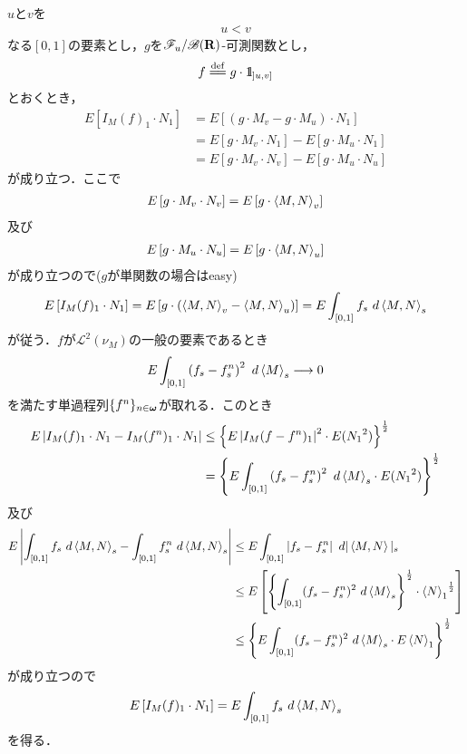	\begin{sketch}
		$u$と$v$を
		\begin{align}
			u < v
		\end{align}
		なる$[0,1]$の要素とし，$g$を$\mathscr{F}_{u}/\mathscr{B}(\mathbf{R})$-可測関数とし，
		\begin{align}
			f \defeq g \cdot \defunc_{]u,v]}
		\end{align}
		とおくとき，
		\begin{align}
			E\left[I_{M}(f)_{1} \cdot N_{1}\right] 
			&= E\left[(g \cdot M_{v} - g \cdot M_{u}) \cdot N_{1}\right] \\
			&= E\left[g \cdot M_{v} \cdot N_{1}\right] - E\left[g \cdot M_{u} \cdot N_{1}\right] \\
			&= E\left[g \cdot M_{v} \cdot N_{v}\right] - E\left[g \cdot M_{u} \cdot N_{u}\right]
		\end{align}
		が成り立つ．ここで
		\begin{align}
			E\left[g \cdot M_{v} \cdot N_{v}\right] 
			= E\left[g \cdot \inprod<M,N>_{v}\right]
		\end{align}
		及び
		\begin{align}
			E\left[g \cdot M_{u} \cdot N_{u}\right] 
			= E\left[g \cdot \inprod<M,N>_{u}\right]
		\end{align}
		が成り立つので($g$が単関数の場合はeasy)
		\begin{align}
			E\left[I_{M}(f)_{1} \cdot N_{1}\right] 
			= E\left[g \cdot \left(\inprod<M,N>_{v} - \inprod<M,N>_{u}\right)\right]
			= E \int_{[0,1]} f_{s}\ d\inprod<M,N>_{s}
		\end{align}
		が従う．$f$が$\mathscr{L}^{2}(\nu_{M})$の一般の要素であるとき
		\begin{align}
			E\int_{[0,1]} \left(f_{s} - f^{n}_{s}\right)^{2}\ d\inprod<M>_{s}
			\longrightarrow 0
		\end{align}
		を満たす単過程列$\{f^{n}\}_{n \in {\boldsymbol \omega}}$が取れる．このとき
		\begin{align}
			E\left|I_{M}(f)_{1} \cdot N_{1} - I_{M}(f^{n})_{1} \cdot N_{1}\right|
			&\leq \left\{ E\left|I_{M}(f - f^{n})_{1}\right|^{2} \cdot E({N_{1}}^{2}) \right\}^{\frac{1}{2}} \\
			&= \left\{ E\int_{[0,1]} \left(f_{s} - f^{n}_{s}\right)^{2}\ d\inprod<M>_{s} \cdot E({N_{1}}^{2}) \right\}^{\frac{1}{2}}
		\end{align}
		及び
		\begin{align}
			E\left|\int_{[0,1]}f_{s}\ d\inprod<M,N>_{s} - \int_{[0,1]} f^{n}_{s}\ d\inprod<M,N>_{s}\right|
			&\leq E\int_{[0,1]} \left| f_{s} - f^{n}_{s} \right|\ d|\inprod<M,N>|_{s} \\
			&\leq E\left[\left\{\int_{[0,1]} (f_{s} - f^{n}_{s})^{2}\ d\inprod<M>_{s}\right\}^{\frac{1}{2}}
			\cdot {\inprod<N>_{1}}^{\frac{1}{2}}\right] \\
			&\leq \left\{E\int_{[0,1]} (f_{s} - f^{n}_{s})^{2}\ d\inprod<M>_{s}
			\cdot E\inprod<N>_{1}\right\}^{\frac{1}{2}}
		\end{align}
		が成り立つので
		\begin{align}
			E\left[I_{M}(f)_{1} \cdot N_{1}\right]
			= E\int_{[0,1]}f_{s}\ d\inprod<M,N>_{s}
		\end{align}
		を得る．
		\QED
	\end{sketch}
	
